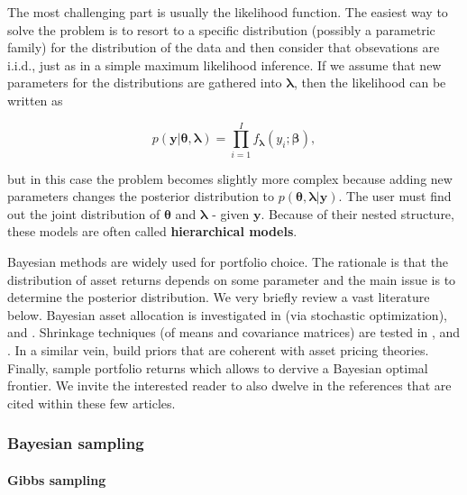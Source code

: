 The most challenging part is usually the likelihood function. The easiest way to solve the problem is to resort to a specific distribution (possibly a parametric family) for the distribution of the data and then consider that obsevations are i.i.d., just as in a simple maximum likelihood inference. If we assume that new parameters for the distributions are gathered into $\boldsymbol{\lambda}$, then the likelihood can be written as

\begin{equation}
\label{eq:likelihood}
p(\textbf{y} |\boldsymbol{\theta}, \boldsymbol{\lambda})=\prod_{i=1}^I f_{\boldsymbol{\lambda}}(y_i; \boldsymbol{\beta}),
\end{equation}

but in this case the problem becomes slightly more complex because adding new parameters changes the posterior distribution to $p(\boldsymbol{\theta}, \boldsymbol{\lambda}|\textbf{y})$. The user must find out the joint distribution of $\boldsymbol{\theta}$ and $\boldsymbol{\lambda}$ - given $\textbf{y}$. Because of their nested structure, these models are often called \textbf{hierarchical models}.

Bayesian methods are widely used for portfolio choice. The rationale is that the distribution of asset returns depends on some parameter and the main issue is to determine the posterior distribution. We very briefly review a vast literature below. Bayesian asset allocation is investigated in \cite{lai2011mean} (via stochastic optimization), \cite{guidolin2016ambiguity} and \cite{dangl2020optimal}. Shrinkage techniques (of means and covariance matrices) are tested in \cite{frost1986empirical}, \cite{kan2007optimal} and \cite{demiguel2015parameter}. In a similar vein, \cite{tu2010incorporating} build priors that are coherent with asset pricing theories. Finally, \cite{bauder2020bayesian} sample portfolio returns which allows to dervive a Bayesian optimal frontier. We invite the interested reader to also dwelve in the references that are cited within these few articles.

\subsubsection{Bayesian sampling}

\paragraph{Gibbs sampling}

